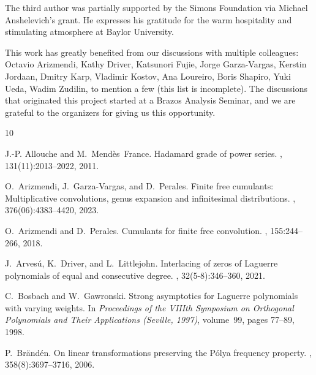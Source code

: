 \documentclass[reqno,11pt]{amsart}
\theoremstyle{remark}
\begin{document}
The third author was partially supported by the Simons Foundation via Michael Anshelevich's grant. He expresses his gratitude for the warm hospitality and stimulating atmosphere at Baylor University.  

This work has greatly benefited from our discussions with multiple colleagues: Octavio Arizmendi, Kathy Driver, Katsunori Fujie, Jorge Garza-Vargas, Kerstin Jordaan, Dmitry Karp, Vladimir Kostov, Ana Loureiro, Boris Shapiro,  Yuki Ueda, Wadim Zudilin, to mention a few (this list is incomplete). The discussions that originated this project started at a Brazos Analysis Seminar, and we are grateful to the organizers for giving us this opportunity.

 
%
%
%

\begin{thebibliography}{10}
	
	J.-P. Allouche and M.~Mend\`es~France.
	\newblock Hadamard grade of power series.
	, 131(11):2013--2022, 2011.
	
	O.~Arizmendi, J.~Garza-Vargas, and D.~Perales.
	\newblock Finite free cumulants: Multiplicative convolutions, genus expansion and infinitesimal distributions.
	, 376(06):4383--4420, 2023.
	
	O.~Arizmendi and D.~Perales.
	\newblock Cumulants for finite free convolution.
	, 155:244--266, 2018.
	
	J.~Arves{\'u}, K.~Driver, and L.~Littlejohn.
	\newblock Interlacing of zeros of Laguerre polynomials of equal and consecutive degree.
	, 32(5-8):346--360,
	2021.
	
	C.~Bosbach and W.~Gawronski.
	\newblock Strong asymptotics for {L}aguerre polynomials with varying weights.
	\newblock In {\em Proceedings of the {VIII}th {S}ymposium on {O}rthogonal
		{P}olynomials and {T}heir {A}pplications ({S}eville, 1997)}, volume~99, pages
	77--89, 1998.
	
	P.~Br{\"{a}}nd\'{e}n.
	\newblock On linear transformations preserving the {P}\'{o}lya frequency property.
	, 358(8):3697--3716, 2006.
	

\end{thebibliography}
\end{document}
